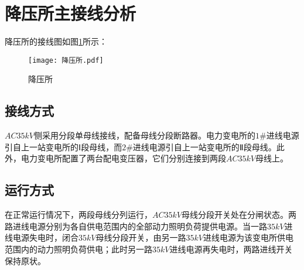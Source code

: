 \section{降压所主接线分析}
降压所的接线图如图\ref{降压所}所示：
\begin{figure}[h]
	\centering
	\texttt{[image: 降压所.pdf]}
	\caption{降压所}
	\label{降压所}
\end{figure}
\subsection{接线方式}
$AC35kV$侧采用分段单母线接线，配备母线分段断路器。电力变电所的$1\#$进线电源引自上一站变电所的$Ⅰ$段母线，而$2\#$进线电源引自上一站变电所的$Ⅱ$段母线。此外，电力变电所配置了两台配电变压器，它们分别连接到两段$AC35kV$母线上。

\subsection{运行方式}
在正常运行情况下，两段母线分列运行，$AC35kV$母线分段开关处在分闸状态。两路进线电源分别为各自供电范围内的全部动力照明负荷提供电源。当一路$35kV$进线电源失电时，闭合$35kV$母线分段开关，由另一路$35kV$进线电源为该变电所供电范围内的动力照明负荷供电；此时另一路$35kV$进线电源再失电时，两路进线开关保持原状。

